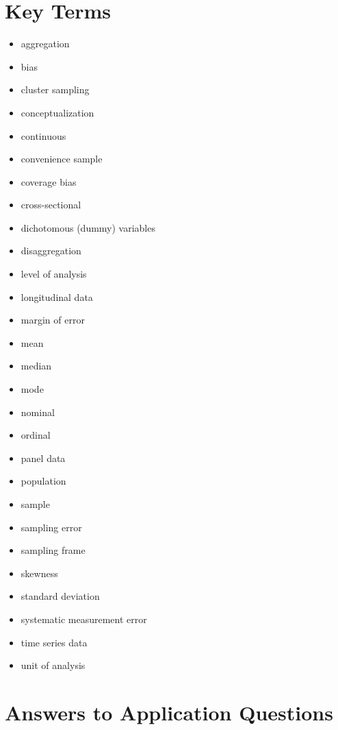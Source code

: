 \documentclass{book}
\begin{document}
\hypertarget{key-terms-1}{%
\section{Key Terms}\label{key-terms-1}}

\begin{itemize}
\item
  aggregation
\item
  bias
\item
  cluster sampling
\item
  conceptualization
\item
  continuous
\item
  convenience sample
\item
  coverage bias
\item
  cross-sectional
\item
  dichotomous (dummy) variables
\item
  disaggregation
\item
  level of analysis
\item
  longitudinal data
\item
  margin of error
\item
  mean
\item
  median
\item
  mode
\item
  nominal
\item
  ordinal
\item
  panel data
\item
  population
\item
  sample
\item
  sampling error
\item
  sampling frame
\item
  skewness
\item
  standard deviation
\item
  systematic measurement error
\item
  time series data
\item
  unit of analysis
\end{itemize}

\hypertarget{answers-to-application-questions-2}{%
\section{Answers to Application
Questions}\label{answers-to-application-questions-2}}
\end{document}
